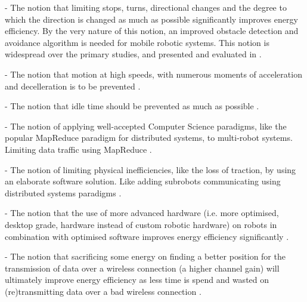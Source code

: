 - The notion that limiting stops, turns, directional changes and the degree to which the direction is changed as much as possible 
significantly improves energy efficiency. By the very nature of this notion, an improved obstacle detection and avoidance algorithm
is needed for mobile robotic systems. This notion is widespread over the primary studies, and presented and evaluated in 
\cite{xie2018mecanum_wheel, kim2016firefighting_robot, benkrid2016multi_robot_exploration, barili1995efficient_motion, 
jia2004grid_strategy_exploration, mei2005energy_consumers_identified, patel2012exploration_strategy}.

- The notion that motion at high speeds, with numerous moments of acceleration and decelleration is to be prevented
\cite{wingstrom2013robot_cell_scheduling}.

- The notion that idle time should be prevented as much as possible \cite{gurel2019industrial_robot_scheduling, 
kaitwanidvilai2020industrial_robot_cycle_time, wingstrom2013robot_cell_scheduling}.

- The notion of applying well-accepted Computer Science paradigms, like the popular MapReduce paradigm for distributed systems,
to multi-robot systems. Limiting data traffic using MapReduce \cite{huh2013distributed_swarm}.

- The notion of limiting physical inefficiencies, like the loss of traction, by using an elaborate software solution.
Like adding subrobots communicating using distributed systems paradigms \cite{kim2016firefighting_robot}.

- The notion that the use of more advanced hardware (i.e. more optimised, desktop grade, hardware instead of custom robotic hardware) 
on robots in combination with optimised software improves energy efficiency significantly \cite{cheng2018FPGA_image_recognition}.

- The notion that sacrificing some energy on finding a better position for the transmission of data over a wireless connection
(a higher channel gain) will ultimately improve energy efficiency as less time is spend and wasted on (re)transmitting 
data over a bad wireless connection \cite{licea2013wireless_comms}.

\vspace{5mm}

